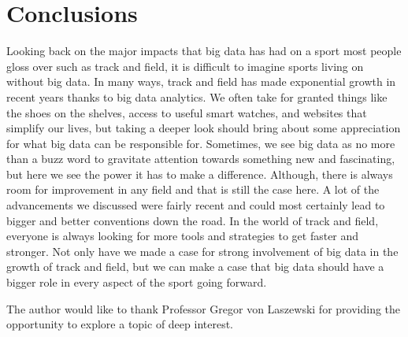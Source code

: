 \documentclass[sigconf]{acmart}
\begin{document}
\section{Conclusions}
Looking back on the major impacts that big data has had on a sport most people gloss over such as track and field, it is difficult to imagine sports living on without big data. In many ways, track and field has made exponential growth in recent years thanks to big data analytics. We often take for granted things like the shoes on the shelves, access to useful smart watches, and websites that simplify our lives, but taking a deeper look should bring about some appreciation for what big data can be responsible for. Sometimes, we see big data as no more than a buzz word to gravitate attention towards something new and fascinating, but here we see the power it has to make a difference. Although, there is always room for improvement in any field and that is still the case here. A lot of the advancements we discussed were fairly recent and could most certainly lead to bigger and better conventions down the road. In the world of track and field, everyone is always looking for more tools and strategies to get faster and stronger. Not only have we made a case for strong involvement of big data in the growth of track and field, but we can make a case that big data should have a bigger role in every aspect of the sport going forward.

\begin{acks}
The author would like to thank Professor Gregor von Laszewski for providing the opportunity to explore a topic of deep interest.

\end{acks}



 
\end{document}
